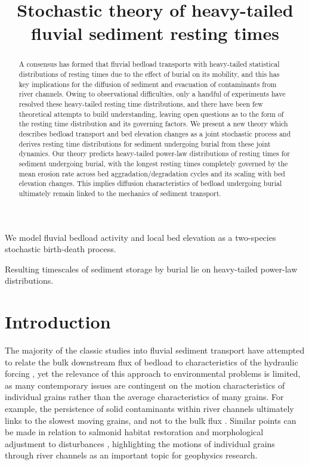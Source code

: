 \documentclass[draft]{agujournal2018}
\begin{document}
\title{Stochastic theory of heavy-tailed fluvial sediment resting times}

\begin{keypoints}
\item We model fluvial bedload activity and local bed elevation as a two-species stochastic birth-death process.
\item Resulting timescales of sediment storage by burial lie on heavy-tailed power-law distributions.
\end{keypoints}

\begin{abstract}
A consensus has formed that fluvial bedload transports with heavy-tailed statistical distributions of resting times due to the effect of burial on its mobility, and this has key implications for the diffusion of sediment and evacuation of contaminants from river channels.
Owing to observational difficulties, only a handful of experiments have resolved these heavy-tailed resting time distributions, and there have been few theoretical attempts to build understanding, leaving open questions as to the form of the resting time distribution and its governing factors.
We present a new theory which describes bedload transport and bed elevation changes as a joint stochastic process and derives resting time distributions for sediment undergoing burial from these joint dynamics.
Our theory predicts heavy-tailed power-law distributions of resting times for sediment undergoing burial, with the longest resting times completely governed by the mean erosion rate across bed aggradation/degradation cycles and its scaling with bed elevation changes.
This implies diffusion characteristics of bedload undergoing burial ultimately remain linked to the mechanics of sediment transport.
\end{abstract} 

\section{Introduction}

The majority of the classic studies into fluvial sediment transport have attempted to relate the bulk downstream flux of bedload to characteristics of the hydraulic forcing \citep[e.g.][]{MeyerPeter1948, Yalin1972}, yet the relevance of this approach to environmental problems is limited, as many contemporary issues are contingent on the motion characteristics of individual grains rather than the average characteristics of many grains.
For example, the persistence of solid contaminants within river channels ultimately links to the slowest moving grains, and not to the bulk flux \citep{Malmon2005}.
Similar points can be made in relation to salmonid habitat restoration \citep[e.g.][]{Gaeuman2017} and morphological adjustment to disturbances \citep{Hassan2017}, highlighting the motions of individual grains through river channels as an important topic for geophysics research.
\end{document}
